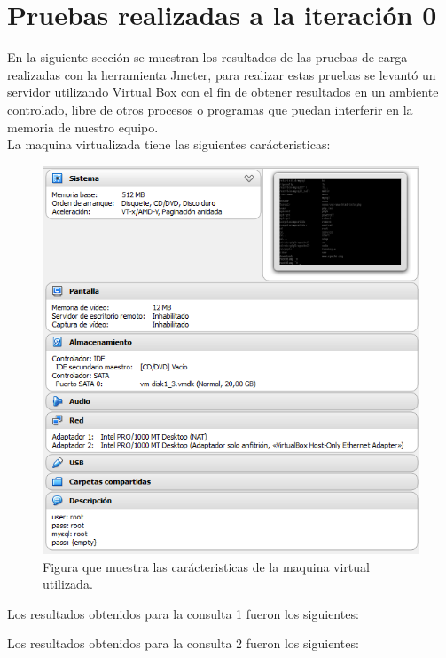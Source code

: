 \section{Pruebas realizadas a la iteración 0}
 
 En la siguiente sección se muestran los resultados de las pruebas de carga realizadas con la herramienta Jmeter, para realizar estas pruebas se levantó un servidor utilizando Virtual Box con el fin de obtener resultados en un ambiente controlado, libre de otros procesos o programas que puedan interferir en la memoria de nuestro equipo. \cite{jmeter} \\
 
 La maquina virtualizada tiene las siguientes carácteristicas:
 
 \begin{figure}[htb]
 	\label{Figura8}
 	\begin{center}
 		\includegraphics[scale=0.7]{imagenes/sistema.png}
 		\caption{Figura que muestra las carácteristicas de la maquina virtual utilizada.}
 	\end{center}
 \end{figure}
 
Los resultados obtenidos para la consulta 1 fueron los siguientes: 

Los resultados obtenidos para la consulta 2 fueron los siguientes: 

